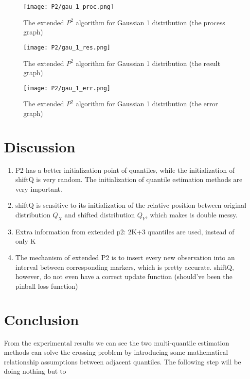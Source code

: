 \begin{figure}[h!]
	\texttt{[image: P2/gau\_1\_proc.png]}
    \caption{The extended $P^2$ algorithm for Gaussian 1 distribution (the process graph)}
    \label{fig: p2_proc}
\end{figure}

\begin{figure}[h!]
	\texttt{[image: P2/gau\_1\_res.png]}
	\caption{The extended $P^2$ algorithm for Gaussian 1 distribution (the result graph)}
    \label{fig: p2_res}
\end{figure}

\begin{figure}[h!]
	\texttt{[image: P2/gau\_1\_err.png]}
    \caption{The extended $P^2$ algorithm for Gaussian 1 distribution (the error graph)}
    \label{fig: p2_err}
\end{figure}

\section{Discussion}
\begin{enumerate}
    \item  P2 has a better initialization point of quantiles, while the initialization of shiftQ is very random. The initialization of quantile estimation methods are very important.
    \item shiftQ is sensitive to its initialization of the relative position between original distribution $Q_X$ and shifted distribution $Q_Y$, which makes is double messy.
    \item Extra information from extended p2: 2K+3 quantiles are used, instead of only K
    \item The mechanism of extended P2 is to insert every new observation into an interval between corresponding markers, which is pretty accurate. shiftQ, however, do not even have a correct update function (should've been the pinball loss function)
\end{enumerate}

\section{Conclusion}
\label{sec: multi_discussion}

From the experimental results we can see the two multi-quantile estimation methods can solve the crossing problem by introducing some mathematical relationship assumptions between adjacent quantiles. The following step will be doing nothing but to 